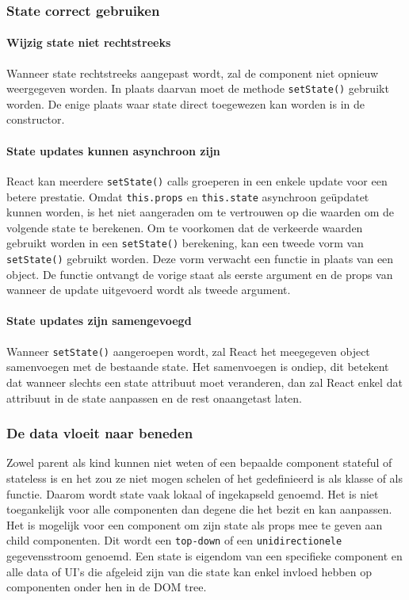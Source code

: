 \subsubsection{State correct gebruiken}

\paragraph{Wijzig state niet rechtstreeks}

Wanneer state rechtstreeks aangepast wordt, zal de component niet opnieuw weergegeven worden. In plaats daarvan moet de methode \texttt{setState()} gebruikt worden. De enige plaats waar state direct toegewezen kan worden is in de constructor. \autocite{React2019d}

\paragraph{State updates kunnen asynchroon zijn}

React kan meerdere \texttt{setState()} calls groeperen in een enkele update voor een betere prestatie. Omdat \texttt{this.props} en \texttt{this.state} asynchroon geüpdatet kunnen worden, is het niet aangeraden om te vertrouwen op die waarden om de volgende state te berekenen. Om te voorkomen dat de verkeerde waarden gebruikt worden in een \texttt{setState()} berekening, kan een tweede vorm van \texttt{setState()} gebruikt worden. Deze vorm verwacht een functie in plaats van een object. De functie ontvangt de vorige staat als eerste argument en de props van wanneer de update uitgevoerd wordt als tweede argument. \autocite{React2019d} %

\paragraph{State updates zijn samengevoegd}

Wanneer \texttt{setState()} aangeroepen wordt, zal React het meegegeven object samenvoegen met de bestaande state. Het samenvoegen is ondiep, dit betekent dat wanneer slechts een state attribuut moet veranderen, dan zal React enkel dat attribuut in de state aanpassen en de rest onaangetast laten. \autocite{React2019d} %

\subsubsection{De data vloeit naar beneden}

Zowel parent als kind kunnen niet weten of een bepaalde component stateful of stateless is en het zou ze niet mogen schelen of het gedefinieerd is als klasse of als functie. Daarom wordt state vaak lokaal of ingekapseld genoemd. Het is niet toegankelijk voor alle componenten dan degene die het bezit en kan aanpassen. Het is mogelijk voor een component om zijn state als props mee te geven aan child componenten. Dit wordt een \texttt{top-down} of een \texttt{unidirectionele} gegevensstroom genoemd. Een state is eigendom van een specifieke component en alle data of UI's die afgeleid zijn van die state kan enkel invloed hebben op componenten onder hen in de DOM tree. \autocite{React2019d}


